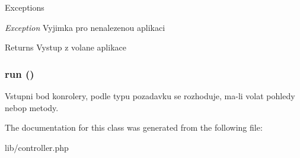 \begin{DoxyExceptions}{Exceptions}
\item[{\em Exception}]Vyjimka pro nenalezenou aplikaci \end{DoxyExceptions}
\begin{DoxyReturn}{Returns}
Vystup z volane aplikace 
\end{DoxyReturn}
\subsubsection[{run}]{\setlength{\rightskip}{0pt plus 5cm}run ()}\label{class_controller_afb0fafe7e02a3ae1993c01c19fad2bae}
Vstupni bod konrolery, podle typu pozadavku se rozhoduje, ma-\/li volat pohledy nebop metody. 

The documentation for this class was generated from the following file:\begin{DoxyCompactItemize}
\item 
lib/controller.php\end{DoxyCompactItemize}
